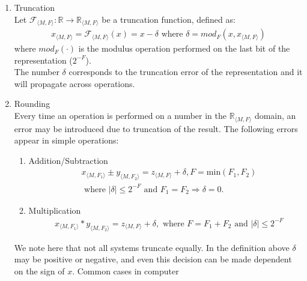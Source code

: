 \documentclass[sigconf]{llncs}
\begin{document}
\begin{enumerate}
\item Truncation\\
Let $\mathcal{F}_{\langle M,F \rangle} : \mathbb{R} \rightarrow \mathbb{R}_{\langle M,F \rangle}$
be a truncation function, defined as:
\begin{align*}
x_{\langle M,F \rangle}=\mathcal{F}_{\langle M,F \rangle}(x) = x-\delta \text{ where } \delta=mod_F(x, x_{\langle M,F \rangle})
\end{align*} 
where $mod_F(\cdot)$ is the modulus operation performed on the last bit of the representation ($2^{-F}$).\\
The number $\delta$ corresponds to the truncation error of the representation and it will propagate across operations.
\item Rounding\\
Every time an operation is performed on a number in the $\mathbb{R}_{\langle M,F \rangle}$ domain, an error may be
introduced due to truncation of the result. 
The following errors appear in simple operations:
\begin{enumerate}
\item Addition/Subtraction
\begin{align*}
&x_{\langle M,F_1\rangle} \pm y_{\langle M,F_2\rangle}=z_{\langle M,F\rangle} + \delta,  F=\text{min}(F_1,F_2)\\
&\text{ where } |\delta| \leq 2^{-F} \text{ and } F_1=F_2 \Rightarrow \delta=0.
\end{align*}
\item Multiplication
\begin{align*}
&x_{\langle M,F_1\rangle} * y_{\langle M,F_2\rangle}=z_{\langle M,F\rangle} + \delta, \text{ where } F=F_1+F_2 \text{ and } |\delta| \leq 2^{-F}
\end{align*}
\end{enumerate}
We note here that not all systems truncate equally.  In the
definition above $\delta$ may be positive or negative, and even this
decision can be made dependent on the sign of $x$.  Common cases in computer

\end{enumerate}
\end{document}
